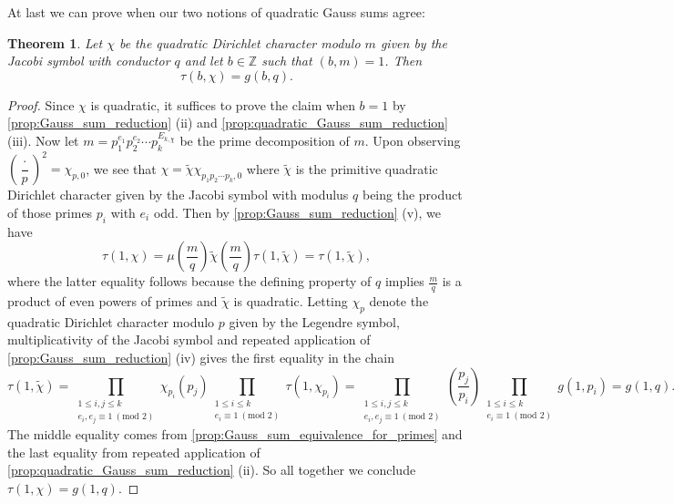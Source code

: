 \documentclass[12pt]{book}
\newtheorem{theorem}{Theorem}[section]
\theoremstyle{definition}\newframedtheorem{method}{Method}
\newcommand{\legendre}[2]{\genfrac{(}{)}{0.5pt}{0}{#1}{#2}}
\newcommand{\tmod}[1]{\ \left(\text{mod }#1\right)}
\newcommand{\<}{\langle}
\renewcommand{\>}{\rangle}
\newcommand{\wtilde}{\widetilde}
\begin{document}
      At last we can prove when our two notions of quadratic Gauss sums agree:

      \begin{theorem}
        Let $\chi$ be the quadratic Dirichlet character modulo $m$ given by the Jacobi symbol with conductor $q$ and let $b \in \mathbb{Z}$ such that $(b,m) = 1$. Then
        \[
          \tau(b,\chi) = g(b,q).
        \]
      \end{theorem}
      \begin{proof}
        Since $\chi$ is quadratic, it suffices to prove the claim when $b = 1$ by \cref{prop:Gauss_sum_reduction} (ii) and \cref{prop:quadratic_Gauss_sum_reduction} (iii). Now let $m = p_{1}^{e_{1}}p_{2}^{e_{2}} \cdots p_{k}^{E_{k,\chi}}$ be the prime decomposition of $m$. Upon observing $\legendre{\cdot}{p}^{2} = \chi_{p,0}$, we see that $\chi = \wtilde{\chi}\chi_{p_{1}p_{2} \cdots p_{k},0}$ where $\wtilde{\chi}$ is the primitive quadratic Dirichlet character given by the Jacobi symbol with modulus $q$ being the product of those primes $p_{i}$ with $e_{i}$ odd. Then by \cref{prop:Gauss_sum_reduction} (v), we have
        \[
          \tau(1,\chi) = \mu\left(\frac{m}{q}\right)\wtilde{\chi}\left(\frac{m}{q}\right)\tau(1,\wtilde{\chi}) = \tau(1,\wtilde{\chi}),
        \]
        where the latter equality follows because the defining property of $q$ implies $\frac{m}{q}$ is a product of even powers of primes and $\wtilde{\chi}$ is quadratic. Letting $\chi_{p}$ denote the quadratic Dirichlet character modulo $p$ given by the Legendre symbol, multiplicativity of the Jacobi symbol and repeated application of \cref{prop:Gauss_sum_reduction} (iv) gives the first equality in the chain
        \[
          \tau(1,\wtilde{\chi}) = \prod_{\substack{1 \le i,j \le k \\ e_{i},e_{j} \equiv 1 \tmod{2}}}\chi_{p_{i}}(p_{j})\prod_{\substack{1 \le i \le k \\ e_{i} \equiv 1 \tmod{2}}}\tau(1,\chi_{p_{i}}) = \prod_{\substack{1 \le i,j \le k \\ e_{i},e_{j} \equiv 1 \tmod{2}}}\legendre{p_{j}}{p_{i}}\prod_{\substack{1 \le i \le k \\ e_{i} \equiv 1 \tmod{2}}}g(1,p_{i}) = g(1,q).
        \]
        The middle equality comes from \cref{prop:Gauss_sum_equivalence_for_primes} and the last equality from repeated application of \cref{prop:quadratic_Gauss_sum_reduction} (ii). So all together we conclude $\tau(1,\chi) = g(1,q)$.
      \end{proof}
\end{document}
